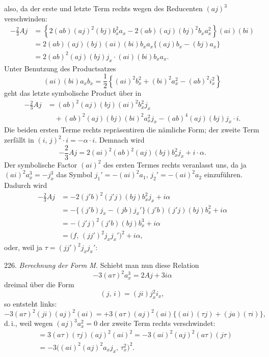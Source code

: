 
also, da der erste und letzte Term rechts wegen des Reducenten $(aj)^3$ verschwinden:
\[
\begin{aligned}
-\frac{2}{3}Aj &= \left\{2(ab)(aj)^2(bj)b_x^2a_x - 2(ab)(aj)(bj)^2b_xa_x^2\right\}(ai)(bi)\\
&= 2(ab)(aj)(bj)(ai)(bi)b_xa_x\{(aj)b_x - (bj)a_x\}\\
&= 2(ab)^2(aj)(bj)j_x\cdot(ai)(bi)b_xa_x.
\end{aligned}
\]
Unter Benutzung des Productsatzes
\[
(ai)(bi)a_xb_x = \frac{1}{2}\left\{(ai)^2b_x^2 + (bi)^2a_x^2 - (ab)^2i_x^2\right\}
\]
geht das letzte symbolische Product über in
\[
\begin{aligned}
-\frac{2}{3}Aj &= (ab)^2(aj)(bj)(ai)^2b_x^2j_x\\
&\quad + (ab)^2(aj)(bj)(bi)^2a_x^2j_x - (ab)^4(aj)(bj)j_x\cdot i.
\end{aligned}
\]
Die beiden ersten Terme rechts repräsentiren die nämliche Form; der zweite Term zerfällt in $(i,\,j)^2\cdot i = -\alpha\cdot i$. Demnach wird
\[
-\frac{2}{3}Aj = 2(ai)^2(ab)^2(aj)(bj)b_x^2j_x + i\cdot\alpha.
\]
Der symbolische Factor $(ai)^2$ des ersten Termes rechts veranlasst uns, da ja $(ai)^2a_x^3 = -j_x^3$ das Symbol $j_1' = -(ai)^2a_1$, $j_2' = -(ai)^2a_2$ einzuführen. Dadurch wird
\[
\begin{aligned}
-\frac{2}{3}Aj &= -2(j'b)^2(j'j)(bj)b_x^2j_x + i\alpha\\
&= -\{(j'b)j_x - (jb)j_x'\}(j'b)(j'j)(bj)b_x^2 + i\alpha\\
&= -(j'j)^2(j'b)(bj)b_x^3 + i\alpha\\
&= \big(f,\,(jj')^2j_xj_x'\big)^2 + i\alpha,
\end{aligned}
\]
oder, weil ja $\tau = (jj')^2j_xj_x'$:


226. \textit{Berechnung der Form M.} Schiebt man nun diese Relation
\[
-3(a\tau)^2a_x^3 = 2Aj + 3i\alpha
\]
dreimal über die Form
\[
(j,\,i) = (ji)j_x^2i_x,
\]
so entsteht links:
\[
-3(a\tau)^2(ji)(aj)^2(ai) = +3(a\tau)(aj)^2(ai)\{(ai)(\tau j) + (ja)(\tau i)\},
\]
d.\,i., weil wegen $(aj)^3a_x^2 = 0$ der zweite Term rechts verschwindet:
\[
\begin{aligned}
&= 3(a\tau)(\tau j)(aj)^2(ai)^2 = -3(ai)^2(aj)^2(a\tau)(j\tau)\\
&= -3\big((ai)^2(aj)^2a_xj_x,\,\tau_x^2\big)^2.
\end{aligned}
\]


